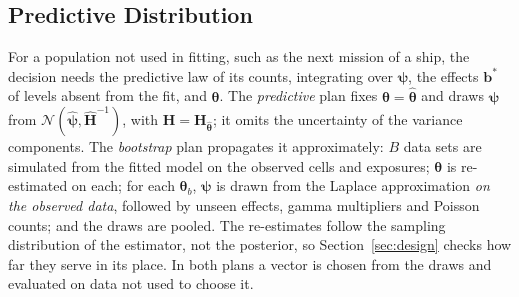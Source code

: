 \subsection{Predictive Distribution}
For a population not used in fitting, such as the next mission of a ship, the
decision needs the predictive law of its counts, integrating over
$\boldsymbol\psi$, the effects $\mathbf b^\ast$ of levels absent from the fit,
and $\boldsymbol\theta$. The \emph{predictive} plan fixes
$\boldsymbol\theta=\hat{\boldsymbol\theta}$ and draws $\boldsymbol\psi$ from
$\mathcal N(\hat{\boldsymbol\psi},\hat{\mathbf H}^{-1})$, with
$\hat{\mathbf H}=\mathbf H_{\hat{\boldsymbol\theta}}$;
it omits the uncertainty of the variance components. The \emph{bootstrap}
plan propagates it approximately: $B$ data sets are simulated from the fitted
model on the observed cells and exposures; $\boldsymbol\theta$ is re-estimated
on each; for each $\boldsymbol\theta_b$, $\boldsymbol\psi$ is drawn from the
Laplace approximation \emph{on the observed data}, followed by unseen effects,
gamma multipliers and Poisson counts; and the draws are pooled. The
re-estimates follow the sampling distribution of the estimator, not the
posterior, so Section~\ref{sec:design} checks how far they serve in its place.
In both plans a vector is chosen from the draws and evaluated on data not
used to choose it.
